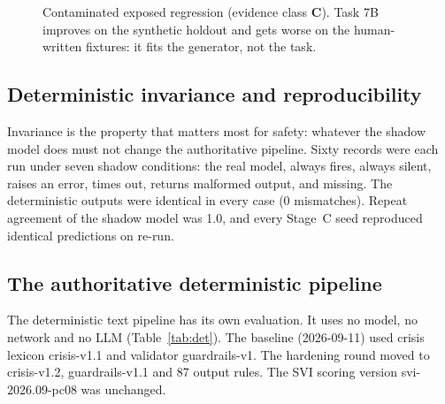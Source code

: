 \documentclass[11pt,a4paper]{article}
\newcommand{\codeus}{\textunderscore\allowbreak}
\DeclareRobustCommand{\code}[1]{{\ttfamily\let\_\codeus #1}}
\newcommand{\evC}{\textsf{\textbf{C}}}
\begin{document}
\begin{figure}[!htbp]
\centering
{}
\caption{Contaminated exposed regression (evidence class \evC). Task 7B improves on the synthetic
holdout and gets worse on the human-written fixtures: it fits the generator, not the task.}
\label{fig:regr}
\end{figure}

\subsection{Deterministic invariance and reproducibility}
Invariance is the property that matters most for safety: whatever the shadow model does must not
change the authoritative pipeline. Sixty records were each run under seven shadow conditions: the
real model, always fires, always silent, raises an error, times out, returns malformed output, and
missing. The deterministic outputs were identical in every case (0 mismatches). Repeat agreement of
the shadow model was 1.0, and every Stage~C seed reproduced identical predictions on re-run.

\subsection{The authoritative deterministic pipeline}
\label{sec:det}
The deterministic text pipeline has its own evaluation. It uses no model, no network and no LLM
(Table~\ref{tab:det}). The baseline (2026-09-11) used crisis lexicon \code{crisis-v1.1} and
validator \code{guardrails-v1}. The hardening round moved to \code{crisis-v1.2},
\code{guardrails-v1.1} and 87 output rules. The SVI scoring version \code{svi-2026.09-pc08} was
unchanged.
\end{document}
